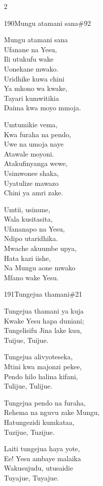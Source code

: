 \begin{multicols}{2}
\begin{hymn}{190}{Mungu atamani sana}{\#92}
\begin{stanza}
Mungu atamani sana\\
Ufanane na Yesu,\\
Ili utukufu wake\\
Uonekane mwako.\\
Uridhike kuwa chini\\
Ya mkono wa kwake,\\
Tayari kumwitikia\\
Daima kwa moyo mmoja.
\end{stanza}
\begin{stanza}
Umtumikie vema,\\
Kwa furaha na pendo,\\
Uwe na umoja naye\\
Atawale moyoni.\\
Atakufinyanga wewe,\\
Usimwonee shaka,\\
Uyatulize mawazo\\
Chini ya amri zake.
\end{stanza}
\begin{stanza}
Umtii, usinune,\\
Wala kusitasita,\\
Ufananapo na Yesu,\\
Ndipo utaridhika.\\
Mwache akuumbe upya,\\
Hata kazi iishe,\\
Na Mungu aone mwako\\
Mfano wake Yesu.
\end{stanza}
\end{hymn}

\begin{hymn}{191}{Tungejua thamani}{\#21}
\begin{stanza}
Tungejua thamani ya kuja\\
Kwake Yesu hapa duniani;\\
Tungelisifu Jina lake kuu,\\
Tuijue, Tuijue.
\end{stanza}
\begin{stanza}
Tungejua alivyoteseka,\\
Mtini kwa majonzi pekee,\\
Pendo hilo halina kifani,\\
Tulijue, Tulijue.
\end{stanza}
\begin{stanza}
Tungejua pendo na furaha,\\
Rehema na nguvu zake Mungu,\\
Hatungezidi kumkataa,\\
Tuzijue, Tuzijue.
\end{stanza}
\begin{stanza}
Laiti tungejua haya yote,\\
Ee! Yesu ambaye malaika\\
Wakusujudu, utusaidie\\
Tuyajue, Tuyajue.
\end{stanza}
\end{hymn}


\end{multicols}
